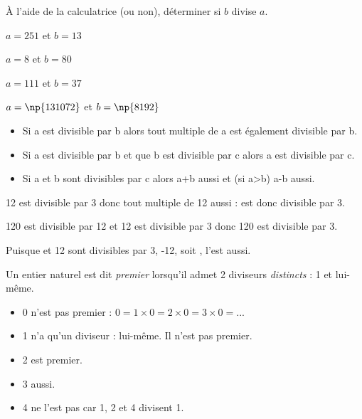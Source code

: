 \begin{exercice}[]
	À l'aide de la calculatrice (ou non), déterminer si $b$ divise $a$.
	\begin{enumalph}
		\item 	$a=251$ et $b=13$
		\item 	$a=8$ et $b=80$
		\item 	$a=111$ et $b=37$
		\item 	$a=\np{131072}$ et $b=\np{8192}$\\
	\end{enumalph}
\end{exercice}


\begin{propriete}[s]
	\begin{itemize}
		\item 	Si a est divisible par b alors tout multiple de a est également divisible par b.
		\item 	Si a est divisible par b et que b est divisible par c alors a est divisible par c.
		\item 	Si a et b sont divisibles par c alors a+b aussi et (si a>b)  a-b aussi.
	\end{itemize}
\end{propriete}
\begin{exemple}[s]
	\begin{enumalph}
		\item 	12 est divisible par 3 donc tout multiple de 12 aussi :  est donc divisible par 3.
		\item 	120 est divisible par 12 et 12 est divisible par 3 donc 120 est divisible par 3.
		\item 	Puisque  et 12 sont divisibles par 3, -12, soit , l'est aussi.
	\end{enumalph}
\end{exemple}
\begin{definition}
	Un entier naturel est dit \textit{premier} lorsqu'il admet 2 diviseurs \textit{distincts} : 1 et lui-même.
	\begin{itemize}
		\item 	0 n'est pas premier : $0=1\times 0=2\times 0=3\times 0=...$
		\item 	1 n'a qu'un diviseur : lui-même. Il n'est pas premier.
		\item 	2 est premier.
		\item 	3 aussi.
		\item 	4 ne l'est pas car 1, 2 et 4 divisent 1.
	\end{itemize}
\end{definition}

